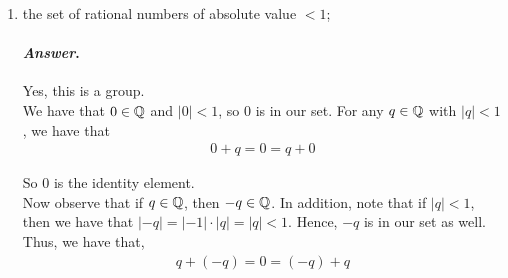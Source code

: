 \documentclass[11pt, reqno]{amsart}
\theoremstyle{plain}
\theoremstyle{definition}
\theoremstyle{example}
\newenvironment{ans}{\color{black}\medskip \paragraph*{\emph{Answer}.}}{\hfill \break  $~\!\!$ \dotfill \medskip }
\begin{document}
\begin{enumerate}[1.]
\begin{enumerate}
\begin{ans}
Yes, this is a group. Firstly, we have the identity element $0 = \frac{0}{2}$. For any rational number $q$ in the described set, we have that
\begin{align*}
q + \frac{0}{2} &= q + 0 = q\\
\frac{0}{2} + q &= 0 + q = q
\end{align*}

Now let $q$ in this set. Then $\exists n,m \in \ZZ$ such that $q = n/m$. Note that $m$ is even and $n$ is odd, since if $n$ were even this fraction would not be in lowest terms.\\

Now consider the fraction $-q = -n/m$. Observe that, since $n$ is odd, we can take $n = 2k + 1$ for some $k \in \ZZ$. When we take $-n$, we have $-n = -2k - 1$. Since $-2k$ is even, we have that $-n$ is still odd. Hence, even if we needed to reduce $-q$ to lowest terms, it would still be in the described set since $m$ would still be even.\\

Now that we have established that $-q$ is in our set, we can show that $q + -q = 0$.\\

Observe that
\begin{align*}
q + -q &= \frac{n}{m} + \frac{-n}{m}\\
&= \frac{n + -n}{m}\\
&= \frac{0}{m} = 0
\end{align*}

The same is true for $-q + q$.
\end{ans}

\item the set of rational numbers of absolute value $< 1$;
	
\begin{ans}
Yes, this is a group.\\

We have that $0 \in \mathbb{Q}$ and $|0| < 1$, so $0$ is in our set. For any $q \in \mathbb{Q}$ with $|q| < 1$, we have that
\begin{align*}
0 + q = 0 = q + 0
\end{align*}

So $0$ is the identity element.\\

Now observe that if $q \in \mathbb{Q}$, then $-q \in \mathbb{Q}$. In addition, note that if $|q| < 1$, then we have that $|-q| = |-1| \cdot |q| = |q| < 1$. Hence, $-q$ is in our set as well. Thus, we have that,
\begin{align*}
q + (-q) = 0 = (-q) + q
\end{align*}


\end{ans}
\end{enumerate}
\end{enumerate}
\end{document}
